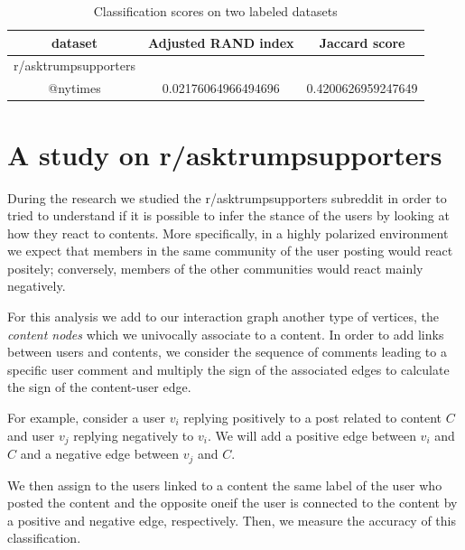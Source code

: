 \begin{table}
	\centering
	\caption{Classification scores on two labeled datasets}
	\label{tab:scores-datasets-labeled}
	\begin{tabular}{c|c|c}
		dataset              & Adjusted RAND index       & Jaccard score            \\
		\hline
		r/asktrumpsupporters &                           &                          \\
		@nytimes             & \num{0.02176064966494696} & \num{0.4200626959247649} \\
	\end{tabular}
\end{table}


\section{A study on r/asktrumpsupporters}%
\label{sec:the_r_asktrumpsupporters_case}

During the research we studied the r/asktrumpsupporters subreddit in order to
tried to understand if it is possible to infer the stance of the users by
looking at how they react to contents. More specifically, in a highly polarized
environment we expect that members in the same community \footnotemark of the
user posting would react positely; conversely, members of the other communities
would react mainly negatively.


\bigskip

For this analysis we add to our interaction graph another type of vertices, the
\emph{content nodes} which we univocally associate to a content. In order to
add links between users and contents, we consider the sequence of comments
leading to a specific user comment and multiply the sign of the
associated edges to calculate the sign of the content-user edge.

For example, consider a user $v_i$
replying positively to a post related to content $C$ and user $v_j$ replying
negatively to $v_i$. We will add a positive edge between $v_i$ and $C$ and a
negative edge between $v_j$ and $C$.

We then assign to the users linked to a content the same label of the user who
posted the content and the opposite one\footnotemark if the user is connected to the content
by a positive and negative edge, respectively. Then, we measure the accuracy of
this classification.

